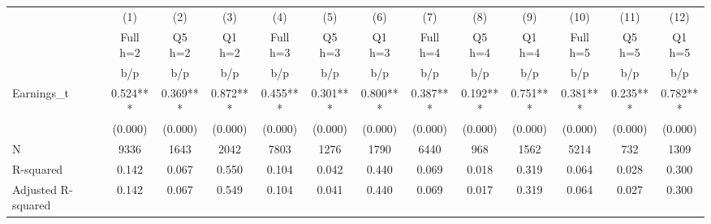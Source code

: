 {
\def\sym#1{\ifmmode^{#1}\else\(^{#1}\)\fi}
\begin{tabular}{l*{12}{c}}
\hline\hline
                    &\multicolumn{1}{c}{(1)}&\multicolumn{1}{c}{(2)}&\multicolumn{1}{c}{(3)}&\multicolumn{1}{c}{(4)}&\multicolumn{1}{c}{(5)}&\multicolumn{1}{c}{(6)}&\multicolumn{1}{c}{(7)}&\multicolumn{1}{c}{(8)}&\multicolumn{1}{c}{(9)}&\multicolumn{1}{c}{(10)}&\multicolumn{1}{c}{(11)}&\multicolumn{1}{c}{(12)}\\
                    &\multicolumn{1}{c}{Full h=2}&\multicolumn{1}{c}{Q5 h=2}&\multicolumn{1}{c}{Q1 h=2}&\multicolumn{1}{c}{Full h=3}&\multicolumn{1}{c}{Q5 h=3}&\multicolumn{1}{c}{Q1 h=3}&\multicolumn{1}{c}{Full h=4}&\multicolumn{1}{c}{Q5 h=4}&\multicolumn{1}{c}{Q1 h=4}&\multicolumn{1}{c}{Full h=5}&\multicolumn{1}{c}{Q5 h=5}&\multicolumn{1}{c}{Q1 h=5}\\
                    &         b/p   &         b/p   &         b/p   &         b/p   &         b/p   &         b/p   &         b/p   &         b/p   &         b/p   &         b/p   &         b/p   &         b/p   \\
\hline
Earnings\_t          &       0.524***&       0.369***&       0.872***&       0.455***&       0.301***&       0.800***&       0.387***&       0.192***&       0.751***&       0.381***&       0.235***&       0.782***\\
                    &     (0.000)   &     (0.000)   &     (0.000)   &     (0.000)   &     (0.000)   &     (0.000)   &     (0.000)   &     (0.000)   &     (0.000)   &     (0.000)   &     (0.000)   &     (0.000)   \\
\hline
N                   &        9336   &        1643   &        2042   &        7803   &        1276   &        1790   &        6440   &         968   &        1562   &        5214   &         732   &        1309   \\
R-squared           &       0.142   &       0.067   &       0.550   &       0.104   &       0.042   &       0.440   &       0.069   &       0.018   &       0.319   &       0.064   &       0.028   &       0.300   \\
Adjusted R-squared  &       0.142   &       0.067   &       0.549   &       0.104   &       0.041   &       0.440   &       0.069   &       0.017   &       0.319   &       0.064   &       0.027   &       0.300   \\
\hline\hline
\end{tabular}
}
